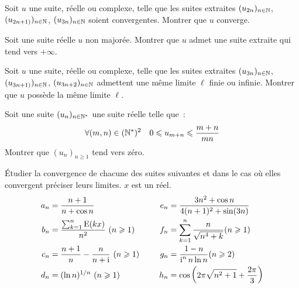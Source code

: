           \begin{exercice}
            Soit \(u\) une suite, réelle ou complexe, telle que les suites 
            extraites \((u_{2n})_{n \in \mathbb{N}}\), \((u_{2n+1)})_{n \in \mathbb{N}}\), 
            \((u_{3n})_{n \in \mathbb{N}}\) soient convergentes. Montrer que \(u\) 
            converge.
          \end{exercice}
          \begin{exercice}
            Soit une suite réelle \(u\) non majorée. Montrer que \(u\) admet une 
            suite extraite qui tend vers \(+\infty\).
          \end{exercice}
          \begin{exercice}
            Soit \(u\) une suite, réelle ou complexe, telle que les suites 
            extraites \((u_{3n})_{n \in \mathbb{N}}\), \((u_{3n+1)})_{n \in \mathbb{N}}\), 
            \((u_{3n+2})_{n \in \mathbb{N}}\) admettent une même limite \(\ell\) finie 
            ou infinie. Montrer que \(u\) possède la même limite \(\ell\).
          \end{exercice}
          \begin{exercice}
            Soit une suite \((u_n)_{n \in \mathbb{N}^*}\) une suite réelle telle que~:
            \[\forall (m,n) \in (\mathbb{N}^*)^2 \quad 0 \leqslant u_{m+n} \leqslant 
            \frac{m+n}{mn}\]
            Montrer que \((u_n)_{n\geqslant 1}\) tend vers zéro.
          \end{exercice}
          \begin{exercice}
            Étudier la convergence de chacune des suites suivantes et dans le 
            cas où elles convergent préciser leurs limites. \(x\) est un réel.
            \begin{align*}
              a_n &= \frac{n+1}{n+\cos n} \qquad & e_n & = \frac{3n^2+\cos 
              n}{4(n+1)^2+\sin(3n)} \\
                b_n &= \frac{\sum_{k = 1}^n \operatorname{E}(kx)}{n^2} \ (n \geqslant 1) 
                \qquad & f_n &= \sum_{k = 1}^n \frac{n}{\sqrt{n^4+k}} (n 
                \geqslant 1) \\
                c_n &= \frac{n+1}{n} - \frac{n}{n+\operatorname{i}} \ (n \geqslant 1) \quad & 
                g_n &= \frac{1-n}{\operatorname{i}^n n \ln n} (n\geqslant 2) \\
                d_n &= (\ln n)^{1/n} \ (n \geqslant 1) \quad & h_n &= 
                \cos\left(2\pi\sqrt{n^2+1}+\frac{2\pi}{3}\right)
              \end{align*}
            \end{exercice}
